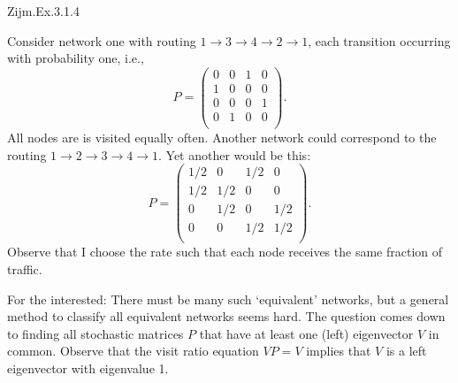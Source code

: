 \begin{exercise}
Zijm.Ex.3.1.4
\begin{solution}
Consider network one with routing $1\to3\to4\to2\to1$, each transition occurring with probability one, i.e.,
\begin{equation*}
  P =
  \begin{pmatrix}
    0 & 0 & 1 & 0  \\
    1 & 0 & 0 & 0  \\
    0 & 0 & 0 & 1  \\
    0 & 1 & 0 & 0  \\
  \end{pmatrix}.
\end{equation*}
All nodes are is visited equally often. Another network could correspond to the routing $1\to2\to3\to4\to1$.  Yet another would be this:
\begin{equation*}
  P =
  \begin{pmatrix}
    1/2 & 0   & 1/2 & 0  \\
    1/2 & 1/2 & 0 & 0  \\
    0   & 1/2 & 0 & 1/2  \\
    0   & 0   & 1/2 & 1/2  \\
  \end{pmatrix}.
\end{equation*}
Observe that I choose the rate such that each node receives the same
fraction of traffic.

For the interested: There must be many such `equivalent' networks, but
a general method to classify all equivalent networks seems hard. The
question comes down to finding all stochastic matrices $P$ that have
at least one (left) eigenvector $V$ in common. Observe that the visit
ratio equation $VP=V$ implies that $V$ is a left eigenvector with
eigenvalue 1.
\end{solution}
\end{exercise}

